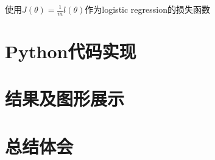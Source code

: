 \documentclass[lang=cn,10pt,a4paper,cite=authoryear]{elegantpaper}
\begin{document}
使用$J(\theta)=\frac{1}{m}l(\theta)$作为logistic regression的损失函数



\subsection{}

\section{Python代码实现}

\section{结果及图形展示}

\section{总结体会}
\end{document}

